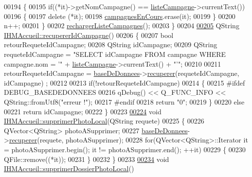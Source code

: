 \begin{DoxyCode}
{00194     \{
00195         \textcolor{keywordflow}{if}((*it)->getNomCampagne() == \hyperlink{class_i_h_m_accueil_afb828a4e06c25afa40341c310cd85b08}{listeCampagne}->currentText())
00196         \{
00197             \textcolor{keyword}{delete} (*it);
00198             \hyperlink{class_i_h_m_accueil_ad3827b81480eb201b5927c16a2ad1c46}{campagnesEnCours}.erase(it);
00199         \}
00200         n++;
00201     \}
00202     \hyperlink{class_i_h_m_accueil_a44074f2d8d59e0d1b7a3d50c24d2a0df}{rechargerListeCampagnes}();
00203 \}
00204 
\hyperlink{class_i_h_m_accueil_a5e222617897b2c1f7e032fa851aa1700}{00205} QString \hyperlink{class_i_h_m_accueil_a5e222617897b2c1f7e032fa851aa1700}{IHMAccueil::recupererIdCampagne}()
00206 \{
00207     \textcolor{keywordtype}{bool} retourRequeteIdCampagne;
00208     QString idCampagne;
00209     QString requeteIdCampagne = \textcolor{stringliteral}{"SELECT idCampagne FROM campagne WHERE campagne.nom = '"} + 
      \hyperlink{class_i_h_m_accueil_afb828a4e06c25afa40341c310cd85b08}{listeCampagne}->currentText() + \textcolor{stringliteral}{"'"};
00210 
00211     retourRequeteIdCampagne = \hyperlink{class_i_h_m_accueil_ab56d9846c071396a92f88272880e2c1f}{baseDeDonnees}->\hyperlink{class_base_de_donnees_a77539baad389f5acf754cd2cd452403e}{recuperer}(requeteIdCampagne, idCampagne)
      ;
00212 
00213     \textcolor{keywordflow}{if}(!retourRequeteIdCampagne)
00214     \{
00215 \textcolor{preprocessor}{        #ifdef DEBUG\_BASEDEDONNEES}
00216             qDebug() << Q\_FUNC\_INFO << QString::fromUtf8(\textcolor{stringliteral}{"erreur !"});
00217 \textcolor{preprocessor}{        #endif}
00218         \textcolor{keywordflow}{return} \textcolor{stringliteral}{"0"};
00219     \}
00220     \textcolor{keywordflow}{else}
00221         \textcolor{keywordflow}{return} idCampagne;
00222 \}
00223 
\hyperlink{class_i_h_m_accueil_a9dc22241cd0d4a227b8b0bf04c6404fd}{00224} \textcolor{keywordtype}{void} \hyperlink{class_i_h_m_accueil_a9dc22241cd0d4a227b8b0bf04c6404fd}{IHMAccueil::supprimerPhotoLocal}(QString requete)
00225 \{
00226     QVector<QString> photoASupprimer;
00227     \hyperlink{class_i_h_m_accueil_ab56d9846c071396a92f88272880e2c1f}{baseDeDonnees}->\hyperlink{class_base_de_donnees_a77539baad389f5acf754cd2cd452403e}{recuperer}(requete, photoASupprimer);
00228     \textcolor{keywordflow}{for}(QVector<QString>::Iterator it = photoASupprimer.begin(); it != photoASupprimer.end(); ++it)
00229     \{
00230        QFile::remove((*it));
00231     \}
00232 \}
00233 
\hyperlink{class_i_h_m_accueil_acb9679f51e140e0bc28d8ac10afd87e9}{00234} \textcolor{keywordtype}{void} \hyperlink{class_i_h_m_accueil_acb9679f51e140e0bc28d8ac10afd87e9}{IHMAccueil::supprimerDossierPhotoLocal}()
}
\end{DoxyCode}
